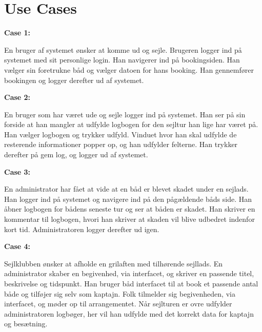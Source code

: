 \chapter{Use Cases}\label{Use_cases}
\textbf{Case 1:}

En bruger af systemet ønsker at komme ud og sejle. 
Brugeren logger ind på systemet med sit personlige login. 
Han navigerer ind på bookingsiden. 
Han vælger sin foretrukne båd og vælger datoen for hans booking. 
Han gennemfører bookingen og logger derefter ud af systemet.

\textbf{Case 2:}

En bruger som har været ude og sejle logger ind på systemet. 
Han ser på sin forside at han mangler at udfylde logbogen for den sejltur han lige har været på. 
Han vælger logbogen og trykker udfyld. 
Vinduet hvor han skal udfylde de resterende informationer popper op, og han udfylder felterne. 
Han trykker derefter på gem log, og logger ud af systemet.

\textbf{Case 3:}

En administrator har fået at vide at en båd er blevet skadet under en sejlads. 
Han logger ind på systemet og navigere ind på den pågældende båds side. 
Han åbner logbogen for bådens seneste tur og ser at båden er skadet. 
Han skriver en kommentar til logbogen, hvori han skriver at skaden vil blive udbedret indenfor kort tid. 
Administratoren logger derefter ud igen.

\cbstart

\textbf{Case 4:}

Sejlklubben ønsker at afholde en grilaften med tilhørende sejllads. 
En administrator skaber en begivenhed, via interfacet, og skriver en passende titel, beskrivelse og tidspunkt. 
Han bruger båd interfacet til at book et passende antal både og tilføjer sig selv som kaptajn.
Folk tilmelder sig begivenheden, via interfacet, og møder op til arrangementet.
Når sejlturen er ovre udfylder administratoren logbøger, her vil han udfylde med det korrekt data for kaptajn og besætning. 

\cbend